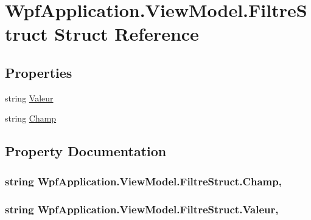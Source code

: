 \hypertarget{struct_wpf_application_1_1_view_model_1_1_filtre_struct}{\section{Wpf\-Application.\-View\-Model.\-Filtre\-Struct Struct Reference}
\label{struct_wpf_application_1_1_view_model_1_1_filtre_struct}
}
\subsection*{Properties}
\begin{DoxyCompactItemize}
\item 
string \hyperlink{struct_wpf_application_1_1_view_model_1_1_filtre_struct_a8a2947c536dcde711e38237e559e7e7f}{Valeur}
\item 
string \hyperlink{struct_wpf_application_1_1_view_model_1_1_filtre_struct_a4f5123d8dd012d39c85fe96b4c135cd8}{Champ}
\end{DoxyCompactItemize}


\subsection{Property Documentation}
\hypertarget{struct_wpf_application_1_1_view_model_1_1_filtre_struct_a4f5123d8dd012d39c85fe96b4c135cd8}{
\subsubsection[{Champ}]{\setlength{\rightskip}{0pt plus 5cm}string Wpf\-Application.\-View\-Model.\-Filtre\-Struct.\-Champ\hspace{0.3cm}{\ttfamily [get]}, {\ttfamily [set]}}}\label{struct_wpf_application_1_1_view_model_1_1_filtre_struct_a4f5123d8dd012d39c85fe96b4c135cd8}
\hypertarget{struct_wpf_application_1_1_view_model_1_1_filtre_struct_a8a2947c536dcde711e38237e559e7e7f}{
\subsubsection[{Valeur}]{\setlength{\rightskip}{0pt plus 5cm}string Wpf\-Application.\-View\-Model.\-Filtre\-Struct.\-Valeur\hspace{0.3cm}{\ttfamily [get]}, {\ttfamily [set]}}}\label{struct_wpf_application_1_1_view_model_1_1_filtre_struct_a8a2947c536dcde711e38237e559e7e7f}


